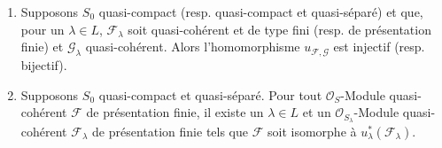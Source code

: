 \begin{theorem}[8.5.2]
\label{IV.8.5.2-fr}
\begin{enumerate}[label=\textup{(\roman*)}]
  \item Supposons $S_0$ quasi-compact (\textup{resp.} quasi-compact et quasi-séparé) et
  que, pour un $\lambda\in L$, $\mathcal F_\lambda$ soit quasi-cohérent et de
  type fini (\textup{resp.} de présentation finie) et $\mathcal G_\lambda$
  quasi-cohérent. Alors l'homomorphisme $u_{\mathcal F,\mathcal G}$ est
  injectif (\textup{resp.} bijectif).

  \item Supposons $S_0$ quasi-compact et quasi-séparé. Pour tout
  $\mathcal O_S$-Module quasi-cohérent $\mathcal F$ de présentation finie, il
  existe un $\lambda\in L$ et un $\mathcal O_{S_\lambda}$-Module
  quasi-cohérent $\mathcal F_\lambda$ de présentation finie tels que
  $\mathcal F$ soit isomorphe à $u_\lambda^*(\mathcal F_\lambda)$.
\end{enumerate}
\end{theorem}


